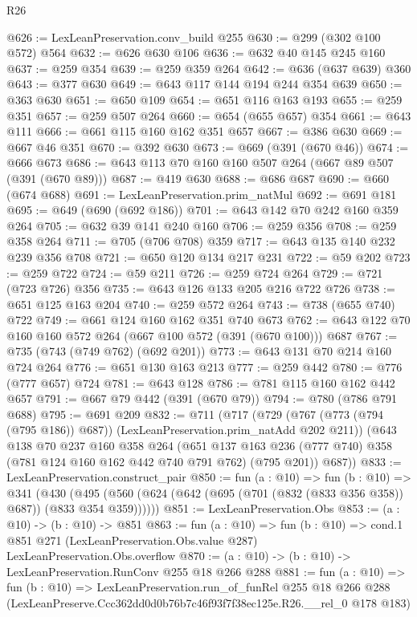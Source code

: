\begin{lexlean}{R26}
\begin{coremodule}
@626 := LexLeanPreservation.conv_build @255
@630 := @299 (@302 @100 @572) @564
@632 := @626 @630 @106
@636 := @632 @40 @145 @245 @160
@637 := @259 @354
@639 := @259 @359 @264
@642 := @636 (@637 @639) @360
@643 := @377 @630
@649 := @643 @117 @144 @194 @244 @354 @639
@650 := @363 @630
@651 := @650 @109
@654 := @651 @116 @163 @193
@655 := @259 @351
@657 := @259 @507 @264
@660 := @654 (@655 @657) @354
@661 := @643 @111
@666 := @661 @115 @160 @162 @351 @657
@667 := @386 @630
@669 := @667 @46 @351
@670 := @392 @630
@673 := @669 (@391 (@670 @46))
@674 := @666 @673
@686 := @643 @113 @70 @160 @160 @507 @264 (@667 @89 @507 (@391 (@670 @89)))
@687 := @419 @630
@688 := @686 @687
@690 := @660 (@674 @688)
@691 := LexLeanPreservation.prim_natMul
@692 := @691 @181
@695 := @649 (@690 (@692 @186))
@701 := @643 @142 @70 @242 @160 @359 @264
@705 := @632 @39 @141 @240 @160
@706 := @259 @356
@708 := @259 @358 @264
@711 := @705 (@706 @708) @359
@717 := @643 @135 @140 @232 @239 @356 @708
@721 := @650 @120 @134 @217 @231
@722 := @59 @202
@723 := @259 @722
@724 := @59 @211
@726 := @259 @724 @264
@729 := @721 (@723 @726) @356
@735 := @643 @126 @133 @205 @216 @722 @726
@738 := @651 @125 @163 @204
@740 := @259 @572 @264
@743 := @738 (@655 @740) @722
@749 := @661 @124 @160 @162 @351 @740 @673
@762 := @643 @122 @70 @160 @160 @572 @264 (@667 @100 @572 (@391 (@670 @100))) @687
@767 := @735 (@743 (@749 @762) (@692 @201))
@773 := @643 @131 @70 @214 @160 @724 @264
@776 := @651 @130 @163 @213
@777 := @259 @442
@780 := @776 (@777 @657) @724
@781 := @643 @128
@786 := @781 @115 @160 @162 @442 @657
@791 := @667 @79 @442 (@391 (@670 @79))
@794 := @780 (@786 @791 @688)
@795 := @691 @209
@832 := @711
    (@717
      (@729 (@767 (@773 (@794 (@795 @186)) @687)) (LexLeanPreservation.prim_natAdd @202 @211))
      (@643
        @138
        @70
        @237
        @160
        @358
        @264
        (@651 @137 @163 @236 (@777 @740) @358 (@781 @124 @160 @162 @442 @740 @791 @762) (@795 @201))
        @687))
@833 := LexLeanPreservation.construct_pair
@850 := fun (a : @10) =>
  fun (b : @10) =>
  @341
    (@430 (@495 (@560 (@624 (@642 (@695 (@701 (@832 (@833 @356 @358)) @687)) (@833 @354 @359))))))
@851 := LexLeanPreservation.Obs
@853 := (a : @10) -> (b : @10) -> @851
@863 := fun (a : @10) =>
  fun (b : @10) =>
  cond.{1} @851 @271 (LexLeanPreservation.Obs.value @287) LexLeanPreservation.Obs.overflow
@870 := (a : @10) -> (b : @10) -> LexLeanPreservation.RunConv @255 @18 @266 @288
@881 := fun (a : @10) =>
  fun (b : @10) =>
  LexLeanPreservation.run_of_funRel
    @255
    @18
    @266
    @288
    (LexLeanPreserve.Ccc362dd0d0b76b7c46f93f7f38ec125e.R26.__rel_0 @178 @183)
\end{coremodule}
\end{lexlean}
